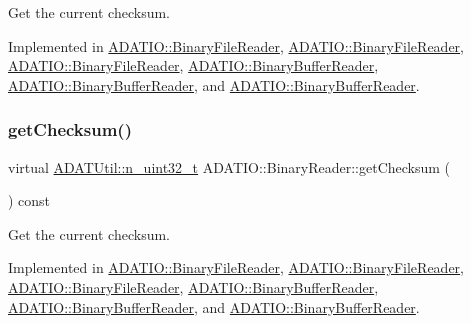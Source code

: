 Get the current checksum. 



Implemented in \mbox{\hyperlink{classADATIO_1_1BinaryFileReader_addb0cfdf4c3df174327b1abc136cfc68}{A\+D\+A\+T\+I\+O\+::\+Binary\+File\+Reader}}, \mbox{\hyperlink{classADATIO_1_1BinaryFileReader_addb0cfdf4c3df174327b1abc136cfc68}{A\+D\+A\+T\+I\+O\+::\+Binary\+File\+Reader}}, \mbox{\hyperlink{classADATIO_1_1BinaryFileReader_addb0cfdf4c3df174327b1abc136cfc68}{A\+D\+A\+T\+I\+O\+::\+Binary\+File\+Reader}}, \mbox{\hyperlink{classADATIO_1_1BinaryBufferReader_ae8e6c22be76223f5e2ce2613e70be4bf}{A\+D\+A\+T\+I\+O\+::\+Binary\+Buffer\+Reader}}, \mbox{\hyperlink{classADATIO_1_1BinaryBufferReader_ae8e6c22be76223f5e2ce2613e70be4bf}{A\+D\+A\+T\+I\+O\+::\+Binary\+Buffer\+Reader}}, and \mbox{\hyperlink{classADATIO_1_1BinaryBufferReader_ae8e6c22be76223f5e2ce2613e70be4bf}{A\+D\+A\+T\+I\+O\+::\+Binary\+Buffer\+Reader}}.

\mbox{\label{classADATIO_1_1BinaryReader_acd705bb96d557a5437410b55beb40bda}} 
\subsubsection{\texorpdfstring{getChecksum()}{getChecksum()}\hspace{0.1cm}{\footnotesize\ttfamily [2/3]}}
{\footnotesize\ttfamily virtual \mbox{\hyperlink{namespaceADATUtil_ad945a8afa4db2d1f89b731964adae97e}{A\+D\+A\+T\+Util\+::n\+\_\+uint32\+\_\+t}} A\+D\+A\+T\+I\+O\+::\+Binary\+Reader\+::get\+Checksum (\begin{DoxyParamCaption}{ }\end{DoxyParamCaption}) const\hspace{0.3cm}{\ttfamily [pure virtual]}}



Get the current checksum. 



Implemented in \mbox{\hyperlink{classADATIO_1_1BinaryFileReader_addb0cfdf4c3df174327b1abc136cfc68}{A\+D\+A\+T\+I\+O\+::\+Binary\+File\+Reader}}, \mbox{\hyperlink{classADATIO_1_1BinaryFileReader_addb0cfdf4c3df174327b1abc136cfc68}{A\+D\+A\+T\+I\+O\+::\+Binary\+File\+Reader}}, \mbox{\hyperlink{classADATIO_1_1BinaryFileReader_addb0cfdf4c3df174327b1abc136cfc68}{A\+D\+A\+T\+I\+O\+::\+Binary\+File\+Reader}}, \mbox{\hyperlink{classADATIO_1_1BinaryBufferReader_ae8e6c22be76223f5e2ce2613e70be4bf}{A\+D\+A\+T\+I\+O\+::\+Binary\+Buffer\+Reader}}, \mbox{\hyperlink{classADATIO_1_1BinaryBufferReader_ae8e6c22be76223f5e2ce2613e70be4bf}{A\+D\+A\+T\+I\+O\+::\+Binary\+Buffer\+Reader}}, and \mbox{\hyperlink{classADATIO_1_1BinaryBufferReader_ae8e6c22be76223f5e2ce2613e70be4bf}{A\+D\+A\+T\+I\+O\+::\+Binary\+Buffer\+Reader}}.

